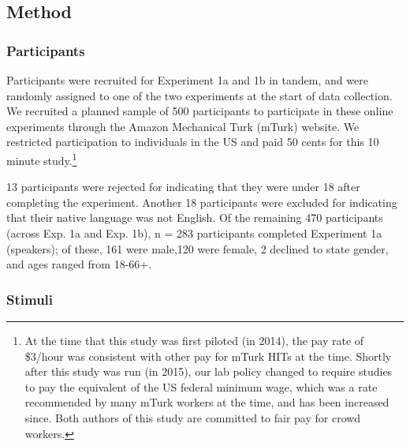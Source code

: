 \documentclass[man, floatsintext, noapacite]{apa6}
\begin{document}
\subsection{Method}

\subsubsection{Participants} 

Participants were recruited for Experiment 1a and 1b in tandem, and were randomly assigned to one of the two experiments at the start of data collection. We recruited a planned sample of 500 participants to participate in these online experiments through the Amazon Mechanical Turk (mTurk) website. We restricted participation to individuals in the US and paid 50 cents for this 10 minute study.\footnote{At the time that this study was first piloted (in 2014), the pay rate of \$3/hour was consistent with other pay for mTurk HITs at the time. Shortly after this study was run (in 2015), our lab policy changed to require studies to pay the equivalent of the US federal minimum wage, which was a rate recommended by many mTurk workers at the time, and has been increased since. Both authors of this study are committed to fair pay for crowd workers.}

 13 participants were rejected for indicating that they were under 18 after completing the experiment. Another 18 participants were excluded for indicating that their native language was not English. Of the remaining 470 participants (across Exp. 1a and Exp. 1b), n = 283 participants completed Experiment 1a (speakers); of these, 161 were male,120 were female, 2 declined to state gender, and ages ranged from 18-66+.

\subsubsection{Stimuli}
\end{document}
